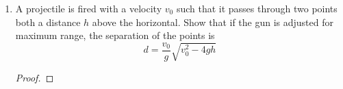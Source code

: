 \documentclass[../psets.tex]{subfiles}
\begin{document}
\begin{enumerate}
\begin{enumerate}
\begin{proof}
\begin{equation*}
                = \pdv{r}(\frac{a}{r})0
                = 0
            \end{equation*}
            Since the curl vanishes, the force \par
            Thus, we can calculate the potential energy $V(\vec{r})$ as follows.
            \begin{align*}
                V(\vec{r}) &= -\int_1^{\vec{r}}\vec{F}\cdot\dd\vec{r}'\\
                &= -\int_1^{|\vec{r}|}\frac{a}{r'}\dd{r'}\\
                \Aboxed{V(\vec{r}) &= -a\ln(|\vec{r}|)}
            \end{align*}
        \end{proof}
    \end{enumerate}
    \item A projectile is fired with a velocity $v_0$ such that it passes through two points both a distance $h$ above the horizontal. Show that if the gun is adjusted for maximum range, the separation of the points is
    \begin{equation*}
        d = \frac{v_0}{g}\sqrt{v_0^2-4gh}
    \end{equation*}
    \begin{proof}

\end{proof}
\end{enumerate}
\end{document}
